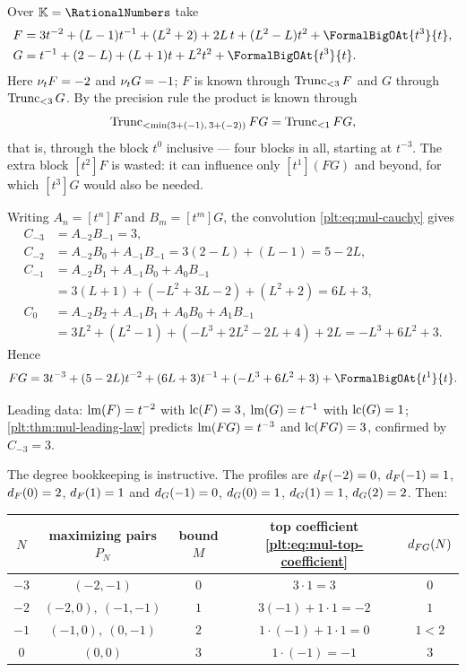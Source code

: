 \begin{example}
\label{plt:ex:mul-worked-laurent}
Over $\K=\RationalNumbers$ take
\begin{align*}
 F&=3t^{-2}+(L-1)t^{-1}+(L^2+2)+2L\,t+(L^2-L)t^2
   +\FormalBigOAt{t^{3}}{t},\\
 G&=t^{-1}+(2-L)+(L+1)t+L^2t^2+\FormalBigOAt{t^{3}}{t}.
\end{align*}
Here $\ordt F=-2$ and $\ordt G=-1$; $F$ is known through $\Trunc{F}{3}$ and
$G$ through $\Trunc{G}{3}$.  By the precision rule the product is known
through
\[
 \Trunc{FG}{\min(3+(-1),\,3+(-2))}=\Trunc{FG}{1},
\]
that is, through the block $t^{0}$ inclusive --- four blocks in all, starting
at $t^{-3}$.  The extra block $[t^2]F$ is wasted: it can influence only
$[t^{1}](FG)$ and beyond, for which $[t^{3}]G$ would also be needed.

Writing $A_n=[t^n]F$ and $B_m=[t^m]G$, the convolution
\eqref{plt:eq:mul-cauchy} gives
\begin{align*}
 C_{-3}&=A_{-2}B_{-1}=3,\\
 C_{-2}&=A_{-2}B_{0}+A_{-1}B_{-1}
        =3(2-L)+(L-1)=5-2L,\\
 C_{-1}&=A_{-2}B_{1}+A_{-1}B_{0}+A_{0}B_{-1}\\
       &=3(L+1)+(-L^2+3L-2)+(L^2+2)=6L+3,\\
 C_{0}&=A_{-2}B_{2}+A_{-1}B_{1}+A_{0}B_{0}+A_{1}B_{-1}\\
      &=3L^2+(L^2-1)+(-L^3+2L^2-2L+4)+2L
      =-L^3+6L^2+3 .
\end{align*}
Hence
\begin{equation}\label{plt:eq:mul-worked-laurent}
 FG=3t^{-3}+(5-2L)t^{-2}+(6L+3)t^{-1}+(-L^3+6L^2+3)
   +\FormalBigOAt{t^{1}}{t}.
\end{equation}

Leading data: $\lm(F)=t^{-2}$ with $\lc(F)=3$, $\lm(G)=t^{-1}$ with
$\lc(G)=1$; \cref{plt:thm:mul-leading-law} predicts $\lm(FG)=t^{-3}$ and
$\lc(FG)=3$, confirmed by $C_{-3}=3$.

The degree bookkeeping is instructive.  The profiles are
$\dprofile{F}(-2)=0$, $\dprofile{F}(-1)=1$, $\dprofile{F}(0)=2$,
$\dprofile{F}(1)=1$ and $\dprofile{G}(-1)=0$, $\dprofile{G}(0)=1$,
$\dprofile{G}(1)=1$, $\dprofile{G}(2)=2$.  Then:

\begin{center}
\begin{tabular}{@{}ccccc@{}}
\hline
$N$ & maximizing pairs $P_N$ & bound $M$ & top coefficient
 \eqref{plt:eq:mul-top-coefficient} & $\dprofile{FG}(N)$ \\
\hline
$-3$ & $(-2,-1)$ & $0$ & $3\cdot1=3$ & $0$ \\
$-2$ & $(-2,0),\ (-1,-1)$ & $1$ & $3(-1)+1\cdot1=-2$ & $1$ \\
$-1$ & $(-1,0),\ (0,-1)$ & $2$ & $1\cdot(-1)+1\cdot1=0$ & $1<2$ \\
$0$  & $(0,0)$ & $3$ & $1\cdot(-1)=-1$ & $3$ \\
\hline
\end{tabular}
\end{center}


\end{example}
